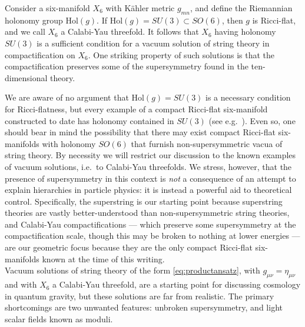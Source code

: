 \documentclass[12pt,a4wide]{article}
\begin{document}
Consider a six-manifold $X_6$ with K\"ahler metric $g_{mn}$, and define the Riemannian holonomy group $\text{Hol}(g)$.  
If $\text{Hol}(g) = SU(3) \subset SO(6)$, then
$g$ is Ricci-flat, and we call $X_6$ a Calabi-Yau threefold.
It follows that $X_6$ having holonomy $SU(3)$ is a sufficient condition for a vacuum solution of string theory in compactification on $X_6$.  
One striking property of such solutions is that the compactification preserves some of the supersymmetry found in the ten-dimensional theory.

We are aware of no argument that $\text{Hol}(g) = SU(3)$ is a necessary condition for Ricci-flatness, but every example of a compact Ricci-flat six-manifold constructed to date has holonomy contained in $SU(3)$ (see e.g.~\cite{Acharya:2019mcu}).
Even so, one should bear in mind the possibility that there may exist compact Ricci-flat six-manifolds with holonomy $SO(6)$ that furnish non-supersymmetric vacua of string theory.  
By necessity we will restrict our discussion to the known examples
of vacuum solutions, i.e.~to Calabi-Yau threefolds.  We stress, however, that the presence of supersymmetry in this context is \emph{not} a consequence of an attempt to explain hierarchies in particle physics: it is instead a powerful aid to theoretical control. Specifically, the superstring is our starting point because superstring theories are vastly better-understood than non-supersymmetric string theories, and Calabi-Yau compactifications --- which preserve some supersymmetry at the compactification scale, though this may be broken to nothing at lower energies --- are our geometric focus because they are the only compact Ricci-flat six-manifolds known at the time of this writing.\\


Vacuum solutions of string theory of the form \eqref{eq:productansatz}, with $g_{\mu\nu}=\eta_{\mu\nu}$ and with $X_6$ a Calabi-Yau threefold, are a starting point for discussing cosmology in quantum gravity, but these solutions are far from realistic.  The primary shortcomings are two unwanted features: unbroken supersymmetry, and light scalar fields known as moduli.  
\end{document}
